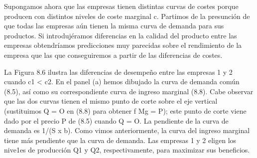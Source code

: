 \documentclass[10pt,a4paper]{article}
\begin{document}
Supongamos ahora que las empresas tienen distintas curvas de costes porque producen con distintos niveles de coste marginal c. Partimos de la presunción de que todas las empresas aún tienen la misma curva de demanda para sus productos. Si introdujéramos diferencias en la calidad del producto entre las empresas obtendríamos predicciones muy parecidas sobre el rendimiento de la empresa que las que conseguiremos a partir de las diferencias de costes. 

La Figura 8.6 ilustra las diferencias de desempeño entre las empresas 1 y 2 cuando c1 < c2. En el panel (a) hemos dibujado la curva de demanda común (8.5), así como su correspondiente curva de ingreso marginal (8.8). Cabe observar que las dos curvas tienen el mismo punto de corte sobre el eje vertical (sustituimos Q = O en (8.8) para obtener f Mg = P); este punto de corte viene dado por el precio P de (8.5) cuando Q = O. La pendiente de la curva de demanda es 1/(S x b). Como vimos anteriormente, la curva del ingreso marginal tiene más pendiente que la curva de demanda. Las empresas 1 y 2 eligen los nive1es de producción Q1 y Q2, respectivamente, para maximizar sus beneficios. 
\end{document}
